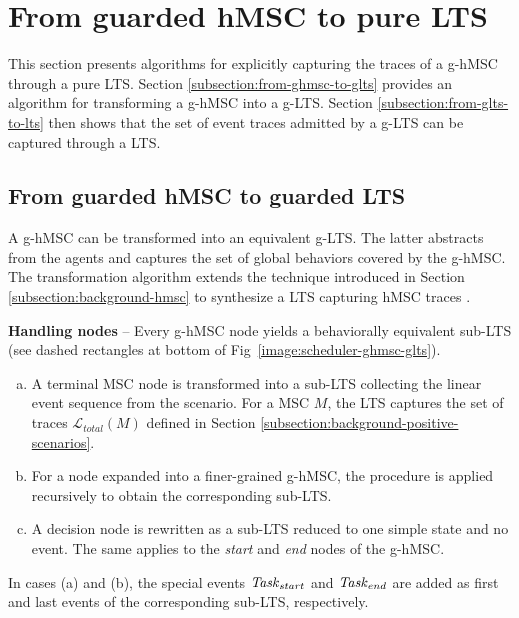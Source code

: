 \section{From guarded hMSC to pure LTS\label{section:deductive-glts-to-lts}}

This section presents algorithms for explicitly capturing the traces of a g-hMSC through a pure LTS. Section \ref{subsection:from-ghmsc-to-glts} provides an algorithm for transforming a g-hMSC into a g-LTS. Section \ref{subsection:from-glts-to-lts} then shows that the set of event traces admitted by a g-LTS can be captured through a LTS.

\subsection{From guarded hMSC to guarded LTS\label{subsection:from-ghmsc-to-glts}}

A g-hMSC can be transformed into an equivalent g-LTS. The latter abstracts from the agents and captures the set of global behaviors covered by the g-hMSC. The transformation algorithm extends the technique introduced in Section \ref{subsection:background-hmsc} to synthesize a LTS capturing hMSC traces \cite{Uchitel:2004}. 

\noindent \textbf{Handling nodes} -- Every g-hMSC node yields a behaviorally equivalent sub-LTS (see dashed rectangles at bottom of Fig~\ref{image:scheduler-ghmsc-glts}).
\begin{enumerate}[(a)]
\item A terminal MSC node is transformed into a sub-LTS collecting the linear event sequence from the scenario. For a MSC $M$, the LTS captures the set of traces $\mathcal{L}_{total}(M)$ defined in Section \ref{subsection:background-positive-scenarios}.
\item For a node expanded into a finer-grained g-hMSC, the procedure is applied recursively to obtain the corresponding sub-LTS.
\item A decision node is rewritten as a sub-LTS reduced to one simple state and no event. The same applies to the \emph{start} and \emph{end} nodes of the g-hMSC.
\end{enumerate}

In cases (a) and (b), the special events $\mbox{\emph{Task}}_{start}$ and $\mbox{\emph{Task}}_{end}$ are added as first and last events of the corresponding sub-LTS, respectively.


